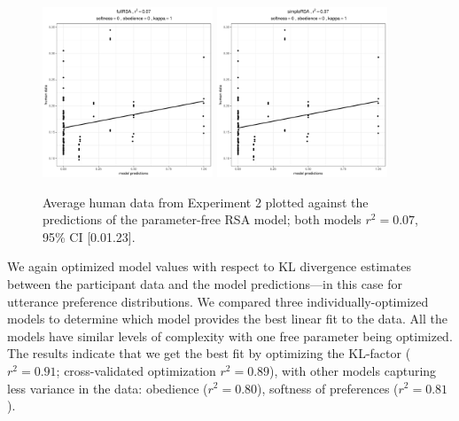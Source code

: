 \documentclass[10pt,a4paper]{article}
\begin{document}
\begin{figure}[ht]
	\centering
	\includegraphics[width=2in]{images/x3_m1.pdf}
	\includegraphics[width=2in]{images/x3_m7.pdf}
	\caption{Average human data from Experiment 2 plotted against the predictions of the parameter-free RSA model; both models $r^{2}=0.07$, 95\% CI [0.01.23].}\label{simple-full-x3}
\end{figure}



We again optimized model values with respect to KL divergence estimates between the participant data and the model predictions---in this case for utterance preference distributions.  We compared three individually-optimized models to determine which model provides the best linear fit to the data. All the models have similar levels of complexity with one free parameter being optimized. The results indicate that we get the best fit by optimizing the KL-factor ($r^{2}=0.91$; cross-validated optimization $r^{2}=0.89$), with other models capturing less variance in the data: obedience ($r^{2}=0.80$), softness of preferences ($r^{2}=0.81$). 
\end{document}
